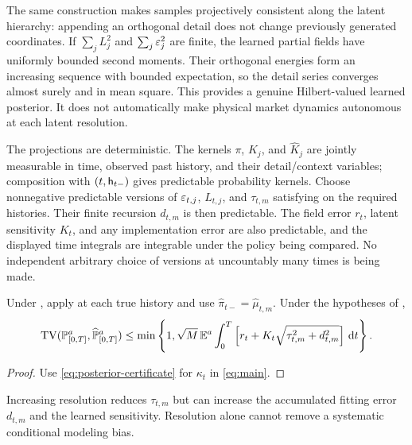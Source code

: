 The same construction makes samples projectively consistent along the latent hierarchy: appending an orthogonal detail does not change previously generated coordinates. If $\sum_jL_j^2$ and $\sum_j\varepsilon_j^2$ are finite, the learned partial fields have uniformly bounded second moments. Their orthogonal energies form an increasing sequence with bounded expectation, so the detail series converges almost surely and in mean square. This provides a genuine Hilbert-valued learned posterior. It does not automatically make physical market dynamics autonomous at each latent resolution.

\begin{assumption}\label{ass:predictable-posterior}
The projections are deterministic. The kernels $\pi$, $K_j$, and $\widehat K_j$ are jointly measurable in time, observed past history, and their detail/context variables; composition with $(t,\mathsf h_{t-})$ gives predictable probability kernels. Choose nonnegative predictable versions of $\varepsilon_{t,j}$, $L_{t,j}$, and $\tau_{t,m}$ satisfying  on the required histories. Their finite recursion $d_{t,m}$ is then predictable. The field error $r_t$, latent sensitivity $K_t$, and any implementation error are also predictable, and the displayed time integrals are integrable under the policy being compared. No independent arbitrary choice of versions at uncountably many times is being made.
\end{assumption}

\begin{corollary}\label{cor:combined}
Under , apply  at each true history and use $\widehat\pi_{t-}=\widehat\mu_{t,m}$. Under the hypotheses of ,
\begin{equation}\label{eq:combined}
 \operatorname{TV}(\mathbb P^a_{[0,T]},\widehat{\mathbb P}^a_{[0,T]})
 \le\min\left\{1,\sqrt M\,\mathbb E^a\int_0^T
 \left[r_t+K_t\sqrt{\tau_{t,m}^2+d_{t,m}^2}\right]\,\mathrm d t\right\}.
\end{equation}
\end{corollary}
\begin{proof}
Use \eqref{eq:posterior-certificate} for $\kappa_t$ in \eqref{eq:main}.
\end{proof}

Increasing resolution reduces $\tau_{t,m}$ but can increase the accumulated fitting error $d_{t,m}$ and the learned sensitivity. Resolution alone cannot remove a systematic conditional modeling bias.

